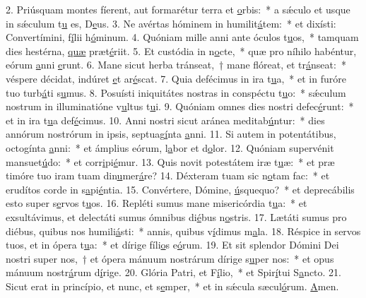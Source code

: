 2. Priúsquam montes fíerent, aut formarétur terra et \uline{o}rbis:~* a sǽculo et usque in sǽculum t\uline{u} es, D\uline{e}us.
3. Ne avértas hóminem in humilit\uline{á}tem:~* et dixísti: Convertímini, f\uline{í}lii h\uline{ó}minum.
4. Quóniam mille anni ante óculos t\uline{u}os,~* tamquam dies hestérna, \uline{quæ} præt\uline{é}riit.
5. Et custódia in n\uline{o}cte,~* quæ pro níhilo habéntur, eórum \uline{a}nni \uline{e}runt.
6. Mane sicut herba tránseat,~† mane flóreat, et tr\uline{á}nseat:~* véspere décidat, indúret \uline{e}t ar\uline{é}scat.
7. Quia defécimus in ira t\uline{u}a,~* et in furóre tuo turb\uline{á}ti s\uline{u}mus.
8. Posuísti iniquitátes nostras in conspéctu t\uline{u}o:~* sǽculum nostrum in illuminatióne v\uline{u}ltus t\uline{u}i.
9. Quóniam omnes dies nostri defec\uline{é}runt:~* et in ira t\uline{u}a def\uline{é}cimus.
10. Anni nostri sicut aránea meditab\uline{ú}ntur:~* dies annórum nostrórum in ipsis, septuag\uline{í}nta \uline{a}nni.
11. Si autem in potentátibus, octogínta \uline{a}nni:~* et ámplius eórum, l\uline{a}bor et d\uline{o}lor.
12. Quóniam supervénit mansuet\uline{ú}do:~* et corr\uline{i}pi\uline{é}mur.
13. Quis novit potestátem iræ t\uline{u}æ:~* et præ timóre tuo iram tuam din\uline{u}mer\uline{á}re?
14. Déxteram tuam sic n\uline{o}tam fac:~* et erudítos corde in s\uline{a}pi\uline{é}ntia.
15. Convértere, Dómine, \uline{ú}squequo?~* et deprecábilis esto super s\uline{e}rvos t\uline{u}os.
16. Repléti sumus mane misericórdia t\uline{u}a:~* et exsultávimus, et delectáti sumus ómnibus di\uline{é}bus n\uline{o}stris.
17. Lætáti sumus pro diébus, quibus nos humili\uline{á}sti:~* annis, quibus v\uline{í}dimus m\uline{a}la.
18. Réspice in servos tuos, et in ópera t\uline{u}a:~* et dírige fíli\uline{o}s e\uline{ó}rum.
19. Et sit splendor Dómini Dei nostri super nos,~† et ópera mánuum nostrárum dírige s\uline{u}per nos:~* et opus mánuum nostr\uline{á}rum d\uline{í}rige.
20. Glória Patri, et F\uline{í}lio,~* et Spir\uline{í}tui S\uline{a}ncto.
21. Sicut erat in princípio, et nunc, et s\uline{e}mper,~* et in sǽcula sæcul\uline{ó}rum. \uline{A}men.
